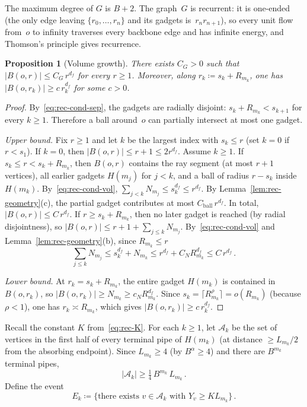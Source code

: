 \documentclass[11pt]{amsart}
\theoremstyle{plain}
\newtheorem{proposition}[theorem]{Proposition}
\theoremstyle{definition}
\begin{document}
	The maximum degree of $G$ is $B{+}2$.  The graph~$G$ is recurrent: it is one-ended (the only edge leaving $\{r_0,\ldots,r_n\}$ and its gadgets is~$r_n r_{n+1}$), so every unit flow from~$o$ to infinity traverses every backbone edge and has infinite energy, and Thomson's principle \citep[Section~2.4]{LP16} gives recurrence.
	
	\begin{proposition}[Volume growth]
		\label{prop:rec-growth}
		There exists $C_G>0$ such that $|B(o,r)|\leq C_G\,r^{d_f}$ for every $r\geq 1$.  Moreover, along $r_k\coloneqq s_k+R_{m_k}$, one has $|B(o,r_k)|\geq c\,r_k^{d_f}$ for some $c>0$.
	\end{proposition}
	
	\begin{proof}
		By~\eqref{eq:rec-cond-sep}, the gadgets are radially disjoint: $s_k+R_{m_k}<s_{k+1}$ for every $k\geq 1$.  Therefore a ball around~$o$ can partially intersect at most one gadget.
		
		\emph{Upper bound.}  Fix $r\geq 1$ and let $k$ be the largest index with $s_k\leq r$ (set $k=0$ if $r<s_1$).  If $k=0$, then $|B(o,r)|\leq r{+}1\leq 2r^{d_f}$.  Assume $k\geq 1$.  If $s_k\leq r<s_k+R_{m_k}$, then $B(o,r)$ contains the ray segment (at most $r{+}1$ vertices), all earlier gadgets $H(m_j)$ for $j<k$, and a ball of radius $r{-}s_k$ inside $H(m_k)$.  By~\eqref{eq:rec-cond-vol}, $\sum_{j<k}N_{m_j}\leq s_k^{d_f}\leq r^{d_f}$.  By Lemma~\ref{lem:rec-geometry}(c), the partial gadget contributes at most $C_{\mathrm{ball}}\,r^{d_f}$.  In total, $|B(o,r)|\leq C\,r^{d_f}$.  If $r\geq s_k+R_{m_k}$, then no later gadget is reached (by radial disjointness), so $|B(o,r)|\leq r{+}1+\sum_{j\leq k}N_{m_j}$.  By~\eqref{eq:rec-cond-vol} and Lemma~\ref{lem:rec-geometry}(b), since $R_{m_k}\leq r$
		\[
		\sum_{j\leq k}N_{m_j} \leq s_k^{d_f}+N_{m_k} \leq r^{d_f}+C_N R_{m_k}^{d_f} \leq C\,r^{d_f}\,.
		\]
		
		\emph{Lower bound.}  At $r_k=s_k+R_{m_k}$, the entire gadget $H(m_k)$ is contained in $B(o,r_k)$, so $|B(o,r_k)|\geq N_{m_k}\geq c_N R_{m_k}^{d_f}$.  Since $s_k=\lceil R_{m_k}^{\rho}\rceil =o(R_{m_k})$ (because $\rho<1$), one has $r_k\asymp R_{m_k}$, which gives $|B(o,r_k)|\geq c\,r_k^{d_f}$.
	\end{proof}
	
	Recall the constant $K$ from~\eqref{eq:rec-K}.  For each $k\geq 1$, let $\mathcal{A}_k$ be the set of vertices in the first half of every terminal pipe of $H(m_k)$ (at distance $\geq L_{m_k}/2$ from the absorbing endpoint).  Since $L_{m_k}\geq 4$ (by $B^{\alpha}\geq 4$) and there are $B^{m_k}$ terminal pipes,
	\begin{equation}\label{eq:rec-Ak}
		|\mathcal{A}_k|\geq\tfrac{1}{4}\,
		B^{m_k}\,L_{m_k}\,.
	\end{equation}
	Define the event
	\begin{equation}
		E_k\coloneqq\bigl\{\text{there exists } v\in\mathcal{A}_k
		\text{ with } Y_v\geq K L_{m_k}\bigr\}\,.
	\end{equation}
	
\end{document}
